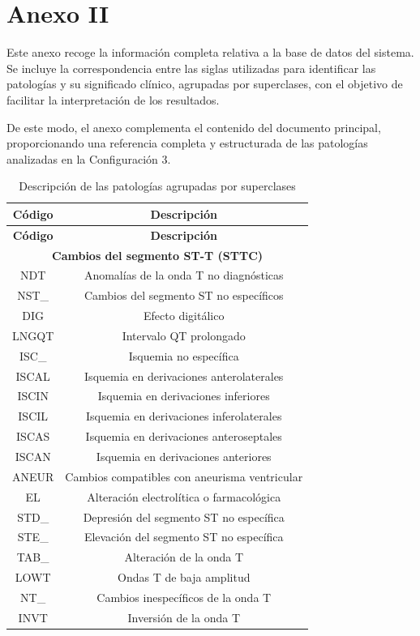 \documentclass[12pt,a4paper,twoside]{book}
\begin{document}
\chapter*{Anexo II}

Este anexo recoge la información completa relativa a la base de datos del sistema.
Se incluye la correspondencia entre las siglas utilizadas para identificar las patologías y su significado clínico, agrupadas por superclases, con el objetivo de facilitar la interpretación de los resultados.

De este modo, el anexo complementa el contenido del documento principal, proporcionando una referencia completa y estructurada de las patologías analizadas en la Configuración 3.



\begin{longtable}{|c|c|}
\caption{Descripción de las patologías agrupadas por superclases} \\
\hline
\textbf{Código} & \textbf{Descripción} \\ 
\hline
\endfirsthead

\hline
\textbf{Código} & \textbf{Descripción}\\ 
\hline
\endhead

\multicolumn{2}{|c|}{\textbf{Cambios del segmento ST-T (STTC)}} \\
\hline
NDT   & Anomalías de la onda T no diagnósticas \\
NST\_ & Cambios del segmento ST no específicos \\
DIG   & Efecto digitálico  \\
LNGQT & Intervalo QT prolongado \\
ISC\_ & Isquemia no específica  \\
ISCAL & Isquemia en derivaciones anterolaterales \\
ISCIN & Isquemia en derivaciones inferiores \\
ISCIL & Isquemia en derivaciones inferolaterales \\
ISCAS & Isquemia en derivaciones anteroseptales \\
ISCAN & Isquemia en derivaciones anteriores \\
ANEUR & Cambios compatibles con aneurisma ventricular \\
EL    & Alteración electrolítica o farmacológica \\
STD\_ & Depresión del segmento ST no específica \\
STE\_ & Elevación del segmento ST no específica \\
TAB\_ & Alteración de la onda T \\
LOWT  & Ondas T de baja amplitud \\
NT\_  & Cambios inespecíficos de la onda T \\
INVT  & Inversión de la onda T \\


\end{longtable}
\end{document}
